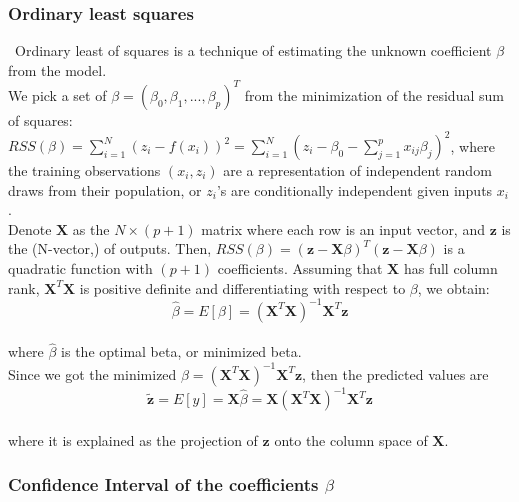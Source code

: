 \subsubsection{Ordinary least squares}
\label{chap:Ordinary least squares}

\qquad \, Ordinary least of squares is a technique of estimating the unknown coefficient $\beta$ from the model.\\

We pick a set of $\beta=(\beta_0, \beta_1, ..., \beta_p)^T$ from the minimization of the residual sum of squares: $RSS(\beta)=\sum^N_{i=1}(z_i-f(x_i))^2=\sum^N_{i=1}(z_i-\beta_0-\sum^p_{j=1}x_{ij}\beta_j)^2$, where the training observations $(x_i, z_i)$ are a representation of independent random draws from their population, or $z_i$'s are conditionally independent given inputs $x_i$. \\

Denote $\textbf{X}$ as the $N\times(p+1)$ matrix where each row is an input vector, and $\textbf{z}$ is the (N-vector,) of outputs. Then, $RSS(\beta)=(\textbf{z}-\textbf{X}\beta)^T(\textbf{z}-\textbf{X}\beta)$ is a quadratic function with $(p+1)$ coefficients. Assuming that $\textbf{X}$ has full column rank, $\textbf{X}^T\textbf{X}$ is positive definite and differentiating with respect to $\beta$, we obtain:\\

\begin{equation}
\label{eq3}
\hat{\beta}=E[\beta]=(\textbf{X}^T\textbf{X})^{-1}\textbf{X}^T\textbf{z}
\end{equation}\\

\noindent where $\hat{\beta}$ is the optimal beta, or minimized beta.\\

Since we got the minimized $\hat{\beta}=(\textbf{X}^T\textbf{X})^{-1}\textbf{X}^T\textbf{z}$, then the predicted values are\\

\begin{equation}
\label{eq4}
\tilde{\textbf{z}}=E[y]=\textbf{X}\hat{\beta}=\textbf{X}(\textbf{X}^T\textbf{X})^{-1}\textbf{X}^T\textbf{z}
\end{equation}\\

\noindent where it is explained as the projection of $\textbf{z}$ onto the column space of $\textbf{X}$.\\

\subsubsection{Confidence Interval of the coefficients $\beta$}
\label{chap:Confidence Interval of the coefficients beta}

